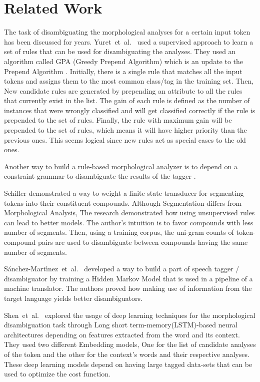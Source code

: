 \documentclass[free]{flammie}
\begin{document}
\section{Related Work} The task of disambiguating the morphological analyses for
a certain input token has been discussed for years.
Yuret~et~al.~\cite{Yuret2006learning} used a supervised approach to learn a set
of rules that can be used for disambiguating the analyses. They used an
algorithm called GPA (Greedy Prepend Algorithm) which is an update to the
Prepend Algorithm \cite{Webb1993learning}. Initially, there is a single rule
that matches all the input tokens and assigns them to the most common class/tag
in the training set. Then, New candidate rules are generated by prepending an
attribute to all the rules that currently exist in the list. The gain of each
rule is defined as the number of instances that were wrongly classified and will
get classified correctly if the rule is prepended to the set of rules. Finally,
the rule with maximum gain will be prepended to the set of rules, which means it
will have higher priority than the previous ones. This seems logical since new
rules act as special cases to the old ones.

Another way to build a rule-based morphological analyzer is to depend on a
constraint grammar to disambiguate the results of the tagger
\cite{UiDhonnchadha2006partofspeech}.

Schiller \cite{Schiller2006german} demonstrated a way to weight a finite state
transducer for segmenting tokens into their constituent compounds. Although
Segmentation differs from Morphological Analysis, The research demonstrated how
using unsupervised rules can lead to better models.
The author's intuition is to favor compounds with less number of segments. Then,
using a training corpus, the uni-gram counts of token-compound pairs are used to
disambiguate between compounds having the same number of segments.

S\'{a}nchez-Mart\'{\i}nez~et~al.~\cite{SanchezMartinez2008hidden} developed a way to
build a part of speech tagger / disambiguator by training a Hidden Markov Model
that is used in a pipeline of a machine translator. The authors proved how
making use of information from the target language yields better disambiguators.

Shen~et~al.~\cite{shen2016role} explored the usage of deep learning
techniques for the morphological disambiguation task through Long short
term-memory(LSTM)-based neural architectures depending on features extracted
from the word and its context. They used two different Embedding models, One for
the list of candidate analyses of the token and the other for the context's
words and their respective analyses.
These deep learning models depend on having large tagged data-sets that can be used to optimize the cost function.
\end{document}

